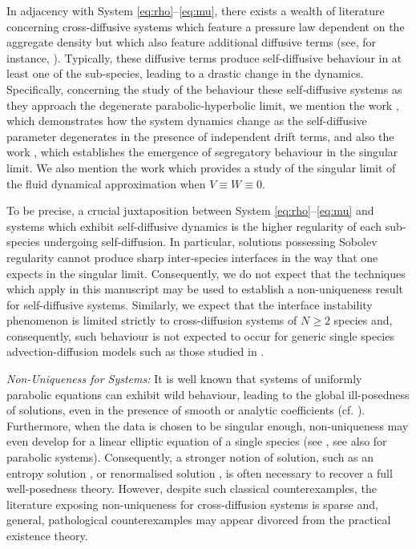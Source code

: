 \documentclass[a4paper,twosided, 11pt]{article}
\theoremstyle{plain}
\theoremstyle{remark}
\numberwithin{equation}{section}
\begin{document}
In adjacency with System \eqref{eq:rho}--\eqref{eq:mu}, there exists a wealth of literature concerning cross-diffusive systems which feature a pressure law dependent on the aggregate density but which also feature additional diffusive terms (see, for instance, \cite{LaurencotMatioc13,DiFrancescoEspositoFagioli18,Laborde20,HirvonenJungel2026}).
Typically, these diffusive terms produce self-diffusive behaviour in at least one of the sub-species, leading to a drastic change in the dynamics.
Specifically, concerning the study of the behaviour these self-diffusive systems as they approach the degenerate parabolic-hyperbolic limit, we mention the work \cite{AlasioBrunaFagioliSchulz22}, which demonstrates how the system dynamics change as the self-diffusive parameter degenerates in the presence of independent drift terms, and also the work \cite{BurgerCarrillo}, which establishes the emergence of segregatory behaviour in the singular limit. 
We also mention the work \cite{CarilloChenBangJungel25} which provides a study of the singular limit of the fluid dynamical approximation when $V \equiv W \equiv 0$.

\medskip 

To be precise, a crucial juxtaposition between System \eqref{eq:rho}--\eqref{eq:mu} and systems which exhibit self-diffusive dynamics is the higher regularity of each sub-species undergoing self-diffusion. 
In particular, solutions possessing Sobolev regularity cannot produce sharp inter-species interfaces in the way that one expects in the singular limit.
Consequently, we do not expect that the techniques which apply in this manuscript may be used to establish a non-uniqueness result for self-diffusive systems.
Similarly, we expect that the interface instability phenomenon is limited strictly to cross-diffusion systems of $N \geq 2$ species and, consequently, such behaviour is not expected to occur for generic single species advection-diffusion models such as those studied in \cite{KimZhang18}.

\medskip 
\emph{Non-Uniqueness for Systems:} 
It is well known that systems of uniformly parabolic equations can exhibit wild behaviour, leading to the global ill-posedness of solutions, even in the presence of smooth or analytic coefficients (cf. \cite{Struwe84,StaraJohn95}). 
Furthermore, when the data is chosen to be singular enough, non-uniqueness may even develop for a linear elliptic equation of a single species (see \cite{Serrin64,Prignet95}, see also  \cite{MullerRieger05} for parabolic systems). 
Consequently, a stronger notion of solution, such as an entropy solution \cite{Carrillo99Entropy}, or renormalised solution \cite{BlanchardMurat97}, is often necessary to recover a full well-posedness theory. 
However, despite such classical counterexamples, the literature exposing non-uniqueness for cross-diffusion systems is sparse and, general, pathological counterexamples may appear divorced from the practical existence theory.
\end{document}
